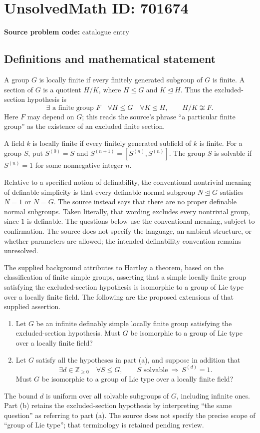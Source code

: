 \documentclass[11pt]{article}
\begin{document}
\section*{UnsolvedMath ID: 701674}
\textbf{Source problem code:} catalogue entry
\subsection{Definitions and mathematical statement}
A group \(G\) is locally finite if every finitely generated subgroup of \(G\) is finite. A section of \(G\) is a quotient \(H/K\), where \(H\leq G\) and \(K\trianglelefteq H\). Thus the excluded-section hypothesis is
\[
\exists\text{ a finite group }F\quad \forall H\leq G\quad \forall K\trianglelefteq H,\qquad H/K\not\cong F.
\]
Here \(F\) may depend on \(G\); this reads the source's phrase ``a particular finite group'' as the existence of an excluded finite section.

A field \(k\) is locally finite if every finitely generated subfield of \(k\) is finite. For a group \(S\), put \(S^{(0)}=S\) and \(S^{(n+1)}=[S^{(n)},S^{(n)}]\). The group \(S\) is solvable if \(S^{(n)}=1\) for some nonnegative integer \(n\).

Relative to a specified notion of definability, the conventional nontrivial meaning of definable simplicity is that every definable normal subgroup \(N\trianglelefteq G\) satisfies \(N=1\) or \(N=G\). The source instead says that there are no proper definable normal subgroups. Taken literally, that wording excludes every nontrivial group, since \(1\) is definable. The questions below use the conventional meaning, subject to confirmation. The source does not specify the language, an ambient structure, or whether parameters are allowed; the intended definability convention remains unresolved.

The supplied background attributes to Hartley a theorem, based on the classification of finite simple groups, asserting that a simple locally finite group satisfying the excluded-section hypothesis is isomorphic to a group of Lie type over a locally finite field. The following are the proposed extensions of that supplied assertion.

\begin{enumerate}
\item[(a)] Let \(G\) be an infinite definably simple locally finite group satisfying the excluded-section hypothesis. Must \(G\) be isomorphic to a group of Lie type over a locally finite field?
\item[(b)] Let \(G\) satisfy all the hypotheses in part (a), and suppose in addition that
\[
\exists d\in\mathbb Z_{\geq 0}\quad \forall S\leq G,\qquad
S\text{ solvable}\ \Longrightarrow\ S^{(d)}=1.
\]
Must \(G\) be isomorphic to a group of Lie type over a locally finite field?
\end{enumerate}
The bound \(d\) is uniform over all solvable subgroups of \(G\), including infinite ones. Part (b) retains the excluded-section hypothesis by interpreting ``the same question'' as referring to part (a). The source does not specify the precise scope of ``group of Lie type''; that terminology is retained pending review.
\end{document}
